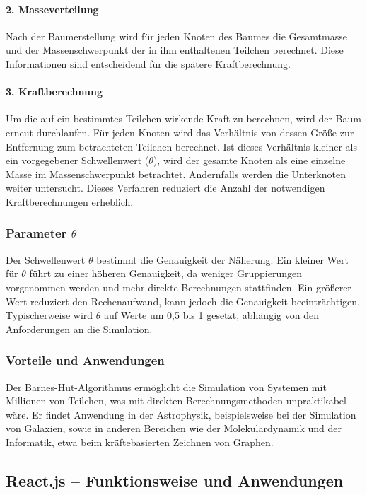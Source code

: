 \documentclass[a4paper,12pt,twoside]{article}
\begin{document}
\paragraph{2. Masseverteilung}
Nach der Baumerstellung wird für jeden Knoten des Baumes die Gesamtmasse und der Massenschwerpunkt der in ihm enthaltenen Teilchen berechnet. Diese Informationen sind entscheidend für die spätere Kraftberechnung.

\paragraph{3. Kraftberechnung}
Um die auf ein bestimmtes Teilchen wirkende Kraft zu berechnen, wird der Baum erneut durchlaufen. Für jeden Knoten wird das Verhältnis von dessen Größe zur Entfernung zum betrachteten Teilchen berechnet. Ist dieses Verhältnis kleiner als ein vorgegebener Schwellenwert ($\theta$), wird der gesamte Knoten als eine einzelne Masse im Massenschwerpunkt betrachtet. Andernfalls werden die Unterknoten weiter untersucht. Dieses Verfahren reduziert die Anzahl der notwendigen Kraftberechnungen erheblich.

\subsubsection{Parameter $\theta$}
Der Schwellenwert $\theta$ bestimmt die Genauigkeit der Näherung. Ein kleiner Wert für $\theta$ führt zu einer höheren Genauigkeit, da weniger Gruppierungen vorgenommen werden und mehr direkte Berechnungen stattfinden. Ein größerer Wert reduziert den Rechenaufwand, kann jedoch die Genauigkeit beeinträchtigen. Typischerweise wird $\theta$ auf Werte um 0,5 bis 1 gesetzt, abhängig von den Anforderungen an die Simulation.

\subsubsection{Vorteile und Anwendungen}
Der Barnes-Hut-Algorithmus ermöglicht die Simulation von Systemen mit Millionen von Teilchen, was mit direkten Berechnungsmethoden unpraktikabel wäre. Er findet Anwendung in der Astrophysik, beispielsweise bei der Simulation von Galaxien, sowie in anderen Bereichen wie der Molekulardynamik und der Informatik, etwa beim kräftebasierten Zeichnen von Graphen.

\subsection{React.js -- Funktionsweise und Anwendungen}
\end{document}
